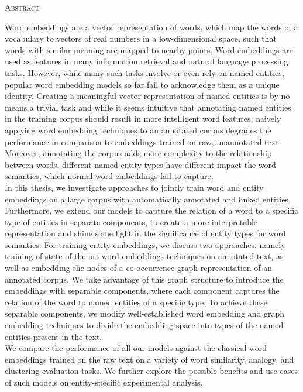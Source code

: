 \begin{center}
  \textsc{Abstract}
\end{center}
%
\noindent
%
Word embeddings are a vector representation of words, which map the words of a vocabulary to vectors of real numbers in a low-dimensional space, such that words with similar meaning are mapped to nearby points. Word embeddings are used as features in many information retrieval and natural language processing tasks. However, while many such tasks involve or even rely on named entities, popular word embedding models so far fail to acknowledge them as a unique identity. Creating a meaningful vector representation of named entities is by no means a trivial task and while it seems intuitive that annotating named entities in the training corpus should result in more intelligent word features, naively applying word embedding techniques to an annotated corpus degrades the performance in comparison to embeddings trained on raw, unannotated text. Moreover, annotating the corpus adds more complexity to the relationship between words, different named entity types have different impact the word semantics, which normal word embeddings fail to capture.
\\
In this thesis, we investigate approaches to jointly train word and entity embeddings on a large corpus with automatically annotated and linked entities. Furthermore, we extend our models to capture the relation of a word to a specific type of entities in separate components, to create a more interpretable representation and shine some light in the significance of entity types for word semantics. For training entity embeddings, we discuss two approaches, namely training of state-of-the-art word embeddings techniques on annotated text, as well as embedding the nodes of a co-occurrence graph representation of an annotated corpus. We take advantage of this graph structure to introduce the embeddings with separable components, where each component captures the relation of the word to named entities of a specific type. To achieve these separable components, we modify well-established word embedding and graph embedding techniques to divide the embedding space into types of the named entities present in the text. \\
We compare the performance of all our models against the classical word embeddings trained on the raw text on a variety of word similarity, analogy, and clustering evaluation tasks. We further explore the possible benefits and use-cases of such models on entity-specific experimental analysis. 

